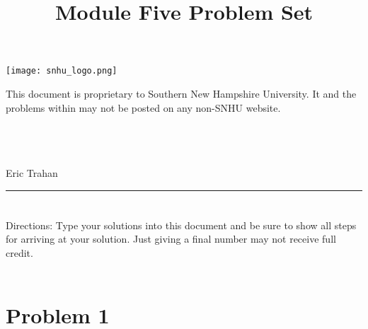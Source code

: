 \documentclass{amsart}
\theoremstyle{definition}
\theoremstyle{Exercise}
\theoremstyle{remark}
\theoremstyle{rule}
\numberwithin{equation}{section}
\begin{document}
\begin{center}
\texttt{[image: snhu\_logo.png]}
\end{center}
\title{\sf Module Five Problem Set}%


\maketitle
This document is proprietary to Southern New Hampshire University. It and the problems within may not be posted on any non-SNHU website.\\\\\\\\
\begin{center}
Eric Trahan
\end{center}


\begin{center}
\rule{\textwidth}{0.4pt}
\end{center}


\newpage

\section*{}
\section*{}
Directions: Type your solutions into this document and be sure to show all steps for arriving at your solution. Just giving a final number may not receive full credit.
\\\\
\section*{Problem 1}
\end{document}
